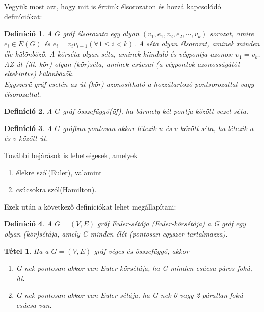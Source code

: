 \documentclass[12pt]{article}
\newtheorem{defin}{Definíció}[section]
\newtheorem{tetel}{Tétel}[section]
\begin{document}
Vegyük most azt, hogy mit is értünk élsorozaton és hozzá kapcsolódó definíciókat:

\begin{defin}
A $G$ gráf élsorozata egy olyan $(v_1,e_1,v_2,e_2,\cdots,v_k)$ sorozat, amire $e_i \in E(G)$ és $e_i = v_iv_{i+1} (\forall 1 \leq i < k)$. A séta olyan élsorozat, aminek minden éle különböző. A körséta olyan séta, aminek kiinduló és végpontja azonos: $v_1 = v_k$. AZ út (ill. kör) olyan (kör)séta, aminek csúcsai (a végpontok azonosságától eltekintve) különbözők.\\
Egyszerü gráf esetén az út (kör) azonositható a hozzátartozó pontsorozattal vagy élsorozattal. ~\cite{szam:Fleiner}
\end{defin}

\begin{defin}
A $G$ gráf összefüggő(öf), ha bármely két pontja között vezet séta. ~\cite{szam:Fleiner}
\end{defin}

\begin{defin}
A $G$ gráfban pontosan akkor létezik $u$ és $v$ között séta, ha létezik $u$ és $v$ között út. ~\cite{szam:Fleiner}
\end{defin}

További bejárások is lehetségesek, amelyek
\begin{enumerate}
\item élekre szól(Euler), valamint 
\item csúcsokra szól(Hamilton).
\end{enumerate}

Ezek után a következő definíciókat lehet megállapítani:

\begin{defin}
A $G = (V,E)$ gráf Euler-sétája (Euler-körsétája) a G gráf egy olyan (kör)sétája, amely G minden élét (pontosan egyszer tartalmazza). ~\cite{szam:Fleiner}
\end{defin}

\begin{tetel}
Ha a $G = (V,E)$ gráf véges és összefüggő, akkor 
\begin{enumerate}
\item G-nek pontosan akkor van Euler-körsétája, ha G minden csúcsa páros fokú, ill.
\item G-nek pontosan akkor van Euler-sétája, ha G-nek 0 vagy 2 páratlan fokú csúcsa van.
\end{enumerate} ~\cite{szam:Fleiner}
\end{tetel}
\end{document}
